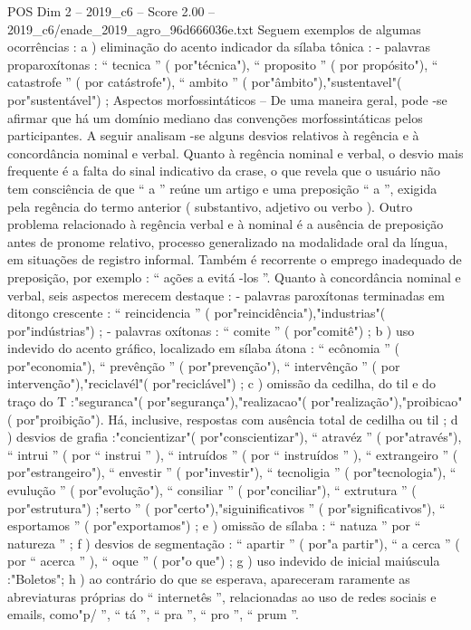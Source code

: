 \begin{textsample}{POS Dim 2 – 2019\_c6 – Score 2.00 – 2019\_c6/enade\_2019\_agro\_96d666036e.txt}
Seguem exemplos de algumas ocorrências : a ) eliminação do acento indicador da sílaba tônica : - palavras proparoxítonas : “ tecnica ” ( por"técnica"), “ proposito ” ( por propósito"), “ catastrofe ” ( por catástrofe"), “ ambito ” ( por"âmbito"),"sustentavel"( por"sustentável") ; Aspectos morfossintáticos – De uma maneira geral, pode -se afirmar que há um domínio mediano das convenções morfossintáticas pelos participantes.
A seguir analisam -se alguns desvios relativos à regência e à concordância nominal e verbal.
Quanto à regência nominal e verbal, o desvio mais frequente é a falta do sinal indicativo da crase, o que revela que o usuário não tem consciência de que “ a ” reúne um artigo e uma preposição “ a ”, exigida pela regência do termo anterior ( substantivo, adjetivo ou verbo ).
Outro problema relacionado à regência verbal e à nominal é a ausência de preposição antes de pronome relativo, processo generalizado na modalidade oral da língua, em situações de registro informal.
Também é recorrente o emprego inadequado de preposição, por exemplo : “ ações a evitá -los ”.
Quanto à concordância nominal e verbal, seis aspectos merecem destaque : - palavras paroxítonas terminadas em ditongo crescente : “ reincidencia ” ( por"reincidência"),"industrias"( por"indústrias") ; - palavras oxítonas : “ comite ” ( por"comitê") ; b ) uso indevido do acento gráfico, localizado em sílaba átona : “ ecônomia ” ( por"economia"), “ prevênção ” ( por"prevenção"), “ intervênção ” ( por intervenção"),"reciclavél"( por"reciclável") ; c ) omissão da cedilha, do til e do traço do T :"seguranca"( por"segurança"),"realizacao"( por"realização"),"proibicao"( por"proibição").
Há, inclusive, respostas com ausência total de cedilha ou til ; d ) desvios de grafia :"concientizar"( por"conscientizar"), “ atravéz ” ( por"através"), “ intrui ” ( por “ instrui ” ), “ intruídos ” ( por “ instruídos ” ), “ extrangeiro ” ( por"estrangeiro"), “ envestir ” ( por"investir"), “ tecnoligia ” ( por"tecnologia"), “ evulução ” ( por"evolução"), “ consiliar ” ( por"conciliar"), “ extrutura ” ( por"estrutura") ;"serto ” ( por"certo"),"siguinificativos ” ( por"significativos"), “ esportamos ” ( por"exportamos") ; e ) omissão de sílaba : “ natuza ” por “ natureza ” ; f ) desvios de segmentação : “ apartir ” ( por"a partir"), “ a cerca ” ( por “ acerca ” ), “ oque ” ( por"o que") ; g ) uso indevido de inicial maiúscula :"Boletos"; h ) ao contrário do que se esperava, apareceram raramente as abreviaturas próprias do “ internetês ”, relacionadas ao uso de redes sociais e emails, como"p/ ”, “ tá ”, “ pra ”, “ pro ”, “ prum ”.

\end{textsample}
